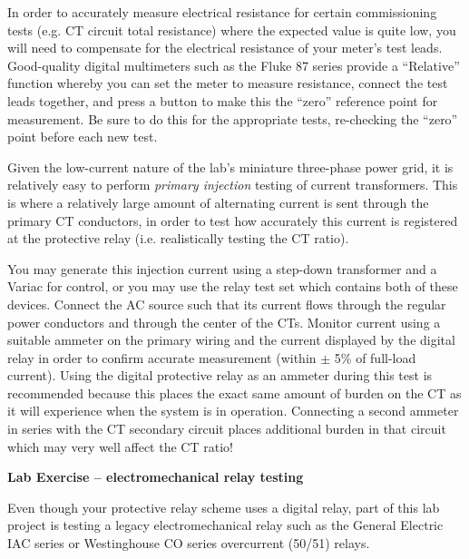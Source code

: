 \vskip 10pt

\filbreak

In order to accurately measure electrical resistance for certain commissioning tests (e.g. CT circuit total resistance) where the expected value is quite low, you will need to compensate for the electrical resistance of your meter's test leads.  Good-quality digital multimeters such as the Fluke 87 series provide a ``Relative'' function whereby you can set the meter to measure resistance, connect the test leads together, and press a button to make this the ``zero'' reference point for measurement.  Be sure to do this for the appropriate tests, re-checking the ``zero'' point before each new test.

\vskip 10pt

Given the low-current nature of the lab's miniature three-phase power grid, it is relatively easy to perform {\it primary injection} testing of current transformers.  This is where a relatively large amount of alternating current is sent through the primary CT conductors, in order to test how accurately this current is registered at the protective relay (i.e. realistically testing the CT ratio).

You may generate this injection current using a step-down transformer and a Variac for control, or you may use the relay test set which contains both of these devices.  Connect the AC source such that its current flows through the regular power conductors and through the center of the CTs.  Monitor current using a suitable ammeter on the primary wiring and the current displayed by the digital relay in order to confirm accurate measurement (within $\pm$ 5\% of full-load current).  Using the digital protective relay as an ammeter during this test is recommended because this places the exact same amount of burden on the CT as it will experience when the system is in operation.  Connecting a second ammeter in series with the CT secondary circuit places additional burden in that circuit which may very well affect the CT ratio!













\vfil \eject

\noindent
{\bf Lab Exercise -- electromechanical relay testing}

\vskip 5pt

Even though your protective relay scheme uses a digital relay, part of this lab project is testing a legacy electromechanical relay such as the General Electric IAC series or Westinghouse CO series overcurrent (50/51) relays.


